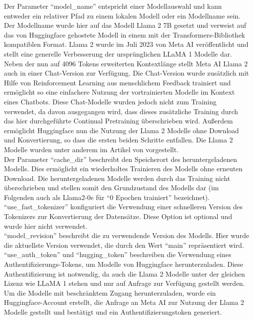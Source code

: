 Der Parameter \enquote{model\_name} entspricht einer Modellauswahl und kann entweder ein relativer Pfad zu einem lokalen Modell oder ein Modellname sein.
Der Modellname wurde hier auf das Modell Llama 2 7B gesetzt und verweist auf das von Huggingface gehostete Modell in einem mit der Transformers-Bibliothek kompatiblen Format.
Llama 2 wurde im Juli 2023 von Meta AI veröffentlicht und stellt eine generelle Verbesserung der ursprünglichen LLaMA 1 Modelle dar.
Neben der nun auf 4096 Tokens erweiterten Kontextlänge stellt Meta AI Llama 2 auch in einer Chat-Version zur Verfügung.
Die Chat-Version wurde zusätzlich mit Hilfe von Reinforcement Learning aus menschlichem Feedback trainiert und ermöglicht so eine einfachere Nutzung der vortrainierten Modelle im Kontext eines Chatbots.
Diese Chat-Modelle wurden jedoch nicht zum Training verwendet, da davon ausgegangen wird, dass dieses zusätzliche Training durch das hier durchgeführte Continual Pretraining überschrieben wird.
Außerdem ermöglicht Huggingface nun die Nutzung der Llama 2 Modelle ohne Download und Konvertierung, so dass die ersten beiden Schritte entfallen.
Die Llama 2 Modelle wurden unter anderem im Artikel von \citet{llama2} vorgestellt.\\

Der Parameter \enquote{cache\_dir} beschreibt den Speicherort des heruntergeladenen Modells.
Dies ermöglicht ein wiederholtes Trainieren des Modells ohne erneuten Download.
Die heruntergeladenen Modelle werden durch das Training nicht überschrieben und stellen somit den Grundzustand des Modells dar (im Folgenden auch als Llama2-0e für \enquote{0 Epochen trainiert} bezeichnet).\\

\enquote{use\_fast\_tokenizer} konfiguriert die Verwendung einer schnelleren Version des Tokenizers zur Konvertierung der Datensätze.
Diese Option ist optional und wurde hier nicht verwendet.\\

\enquote{model\_revision} beschreibt die zu verwendende Version des Modells.
Hier wurde die aktuellste Version verwendet, die durch den Wert \enquote{main} repräsentiert wird.\\

\enquote{use\_auth\_token} und \enquote{hugging\_token} beschreiben die Verwendung eines Authentifizierungs-Tokens, um Modelle von Huggingface herunterzuladen.
Diese Authentifizierung ist notwendig, da auch die Llama 2 Modelle unter der gleichen Lizenz wie LLaMA 1 stehen und nur auf Anfrage zur Verfügung gestellt werden.
Um die Modelle mit beschränktem Zugang herunterzuladen, wurde ein Huggingface-Account erstellt, die Anfrage an Meta AI zur Nutzung der Llama 2 Modelle gestellt und bestätigt und ein Authentifizierungstoken generiert.\\

